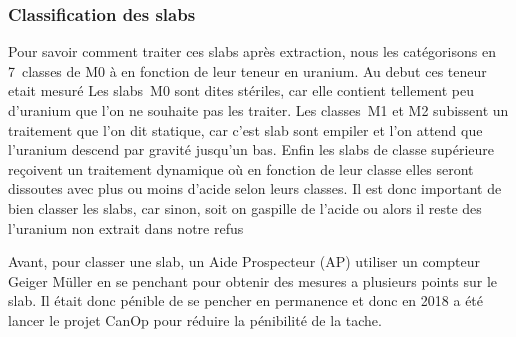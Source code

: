\subsubsection{Classification des slabs}
Pour savoir comment traiter ces slabs  après extraction, nous les catégorisons en 7~classes de M0 à  en fonction de leur teneur en uranium. Au debut ces teneur etait mesuré  Les slabs~M0 sont dites stériles, car elle contient tellement peu d'uranium que l'on ne souhaite pas les traiter. Les classes~M1 et M2 subissent un traitement que l'on dit statique, car c'est slab sont empiler et l’on attend que l'uranium descend par gravité jusqu'un bas. Enfin les slabs de classe supérieure reçoivent un traitement dynamique où en fonction de leur classe elles seront dissoutes avec plus ou moins d'acide selon leurs classes. Il est donc important de bien classer les slabs, car sinon, soit on gaspille  de l'acide ou alors il reste des l'uranium non extrait dans notre refus
\par Avant, pour classer une slab, un Aide Prospecteur (AP) utiliser un compteur Geiger Müller en se penchant pour obtenir des mesures a plusieurs points sur le slab. Il était donc pénible de se pencher en permanence et donc en 2018 a été lancer le projet CanOp pour réduire la pénibilité de la tache.